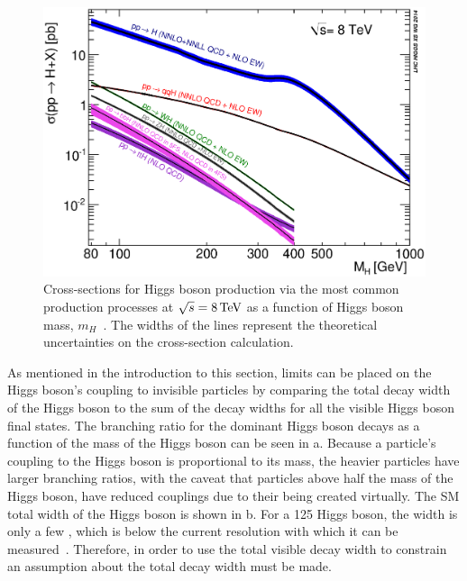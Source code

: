 \begin{figure}
  \includegraphics[width=\largefigwidth]{plots/theory/XS_8TeV.eps}
  \caption[Cross-sections for Higgs boson production via the most common production processes at $\sqrt{s}=8 \TeV$ as a function of Higgs boson mass, $m_{H}$. The widths of the lines represent the theoretical uncertainties on the cross-section calculation.]{Cross-sections for Higgs boson production via the most common production processes at $\sqrt{s}=8 \TeV$ as a function of Higgs boson mass, $m_{H}$~\cite{Heinemeyer:1559921}. The widths of the lines represent the theoretical uncertainties on the cross-section calculation.}
  \label{fig:smprod}
\end{figure}

As mentioned in the introduction to this section, limits can be placed on the Higgs boson's coupling to invisible particles by comparing the total decay width of the Higgs boson to the sum of the decay widths for all the visible Higgs boson final states. The branching ratio for the dominant Higgs boson decays as a function of the mass of the Higgs boson can be seen in a. Because a particle's coupling to the Higgs boson is proportional to its mass, the heavier particles have larger branching ratios, with the caveat that particles above half the mass of the Higgs boson, have reduced couplings due to their being created virtually. The \ac{SM} total width of the Higgs boson is shown in b. For a 125 \GeV Higgs boson, the width is only a few \MeV, which is below the current resolution with which it can be measured~\cite{Khachatryan201464}.
Therefore, in order to use the total visible decay width to constrain \BRinv an assumption about the total decay width must be made. 

